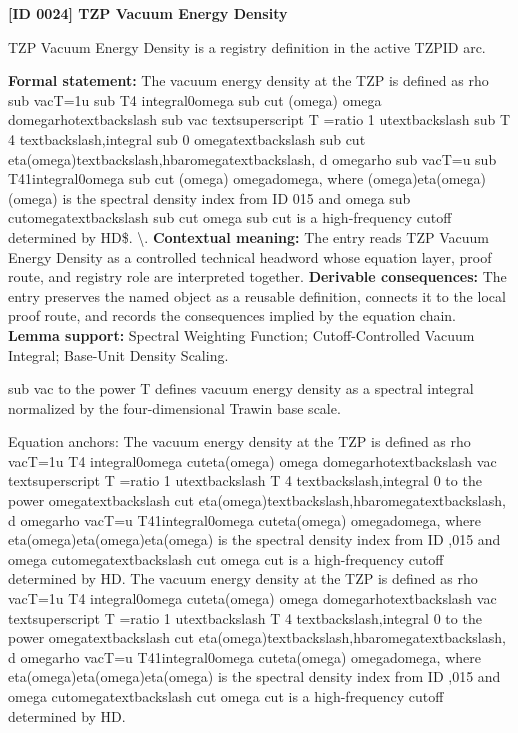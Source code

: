 \clearpage
\noindent\textbf{[ID 0024] TZP Vacuum Energy Density}\par
\vspace{0.35em}
\begingroup\small
{}
TZP Vacuum Energy Density is a registry definition in the active TZPID arc.

\begingroup\footnotesize\setlength{\emergencystretch}{3em}\sloppy
\textbf{Formal statement:} The vacuum energy density at the TZP is defined as rho sub vacT=1u sub T4 integral0omega sub cut (omega)  omega domegarhotextbackslash sub vac textsuperscript T =ratio 1 utextbackslash sub T 4 textbackslash,integral sub 0 omegatextbackslash sub cut eta(omega)textbackslash,hbaromegatextbackslash, d omegarho sub vacT=u sub T41integral0omega sub cut (omega) omegadomega, where  (omega)eta(omega) (omega) is the spectral density index from ID 015 and omega sub cutomegatextbackslash sub cut omega sub cut is a high-frequency cutoff determined by HD\$. \textbackslash{}. \textbf{Contextual meaning:} The entry reads TZP Vacuum Energy Density as a controlled technical headword whose equation layer, proof route, and registry role are interpreted together. \textbf{Derivable consequences:} The entry preserves the named object as a reusable definition, connects it to the local proof route, and records the consequences implied by the equation chain. \textbf{Lemma support:} Spectral Weighting Function; Cutoff-Controlled Vacuum Integral; Base-Unit Density Scaling.\par
\endgroup

sub vac to the power T defines vacuum energy density as a spectral integral normalized by the four-dimensional Trawin base scale.

Equation anchors: The vacuum energy density at the TZP is defined as rho vacT=1u T4 integral0omega cuteta(omega)  omega domegarhotextbackslash vac textsuperscript T =ratio 1 utextbackslash T 4 textbackslash,integral 0 to the power omegatextbackslash cut eta(omega)textbackslash,hbaromegatextbackslash, d omegarho vacT=u T41integral0omega cuteta(omega) omegadomega, where eta(omega)eta(omega)eta(omega) is the spectral density index from ID ,015 and omega cutomegatextbackslash cut omega cut is a high-frequency cutoff determined by HD. The vacuum energy density at the TZP is defined as rho vacT=1u T4 integral0omega cuteta(omega)  omega domegarhotextbackslash vac textsuperscript T =ratio 1 utextbackslash T 4 textbackslash,integral 0 to the power omegatextbackslash cut eta(omega)textbackslash,hbaromegatextbackslash, d omegarho vacT=u T41integral0omega cuteta(omega) omegadomega, where eta(omega)eta(omega)eta(omega) is the spectral density index from ID ,015 and omega cutomegatextbackslash cut omega cut is a high-frequency cutoff determined by HD.

